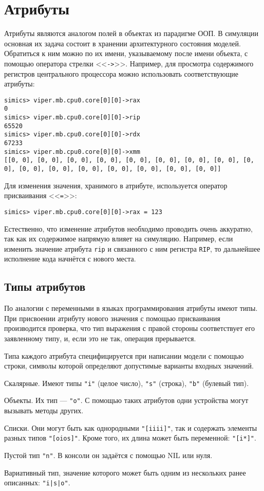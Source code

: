 \section{Атрибуты}

Атрибуты являются аналогом полей в объектах из парадигме ООП. В симуляции основная их задача состоит в хранении архитектурного состояния моделей. Обратиться к ним можно по их имени, указываемому после имени объекта, с помощью оператора стрелки <<\texttt{->}>>. Например, для просмотра содержимого регистров центрального процессора можно использовать соответствующие атрибуты:
\begin{lstlisting}
simics> viper.mb.cpu0.core[0][0]->rax
0
simics> viper.mb.cpu0.core[0][0]->rip
65520
simics> viper.mb.cpu0.core[0][0]->rdx
67233
simics> viper.mb.cpu0.core[0][0]->xmm
[[0, 0], [0, 0], [0, 0], [0, 0], [0, 0], [0, 0], [0, 0], [0, 0], [0, 0], [0, 0], [0, 0], [0, 0], [0, 0], [0, 0], [0, 0], [0, 0]]
\end{lstlisting}

Для изменения значения, хранимого в атрибуте, используется оператор присваивания <<\texttt{=}>>:
\begin{lstlisting}
simics> viper.mb.cpu0.core[0][0]->rax = 123
\end{lstlisting}

Естественно, что изменение атрибутов необходимо проводить очень аккуратно, так как их содержимое напрямую влияет на симуляцию. Например, если изменить значение атрибута \texttt{rip} и связанного с ним регистра \texttt{RIP}, то дальнейшее исполнение кода начнётся с нового места.

\subsection{Типы атрибутов}

По аналогии с переменными в языках программирования атрибуты имеют типы. При присвоении атрибуту нового значения с помощью присваивания производится проверка, что тип выражения с правой стороны соответствует его заявленному типу, и, если это не так, операция прерывается.

Типа каждого атрибута специфицируется при написании модели с помощью строки, символы которой определяют допустимые варианты входных значений.

\begin{enumerate*}
\item Скалярные. Имеют типы \texttt{"i"} (целое число), \texttt{"s"} (строка), \texttt{"b"} (булевый тип).
\item Объекты. Их тип --- \texttt{"o"}. С помощью таких атрибутов одни устройства могут вызывать методы других.
\item Списки. Они могут быть как однородными \texttt{"[iiii]"}, так и содержать элементы разных типов \texttt{"[oios]"}. Кроме того, их длина может быть переменной: \texttt{"[i*]"}.
\item Пустой тип \texttt{"n"}. В консоли он задаётся с помощью NIL или нуля.
\item Вариативный тип, значение которого может быть одним из нескольких ранее описанных: \texttt{"i|s|o"}.

\end{enumerate*}

